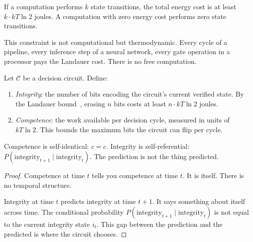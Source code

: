 \begin{corollary}\label{cor:no-free-computation}
If a computation performs $k$ state transitions, the total energy cost is at least $k \cdot kT\ln 2$ joules. A computation with zero energy cost performs zero state transitions.
\end{corollary}

\begin{remark}
This constraint is not computational but thermodynamic. Every cycle of a pipeline, every inference step of a neural network, every gate operation in a processor pays the Landauer cost. There is no free computation.
\end{remark}

\begin{definition}\label{def:integrity-competence}
Let $\mathcal{C}$ be a decision circuit. Define:
\begin{enumerate}
  \item \emph{Integrity}: the number of bits encoding the circuit's current verified state. By the Landauer bound~\cite{landauer1961irreversibility}, erasing $n$ bits costs at least $n \cdot kT\ln 2$ joules.
  \item \emph{Competence}: the work available per decision cycle, measured in units of $kT\ln 2$. This bounds the maximum bits the circuit can flip per cycle.
\end{enumerate}
\end{definition}

\begin{proposition}\label{prop:structural-asymmetry}
Competence is self-identical: $c = c$. Integrity is self-referential: $P(\text{integrity}_{t+1} \mid \text{integrity}_t)$. The prediction is not the thing predicted.
\end{proposition}

\begin{proof}
Competence at time $t$ tells you competence at time $t$. It is itself. There is no temporal structure.

Integrity at time $t$ predicts integrity at time $t+1$. It says something about itself across time. The conditional probability $P(\text{integrity}_{t+1} \mid \text{integrity}_t)$ is not equal to the current integrity state $i_t$. This gap between the prediction and the predicted is where the circuit chooses.
\end{proof}

